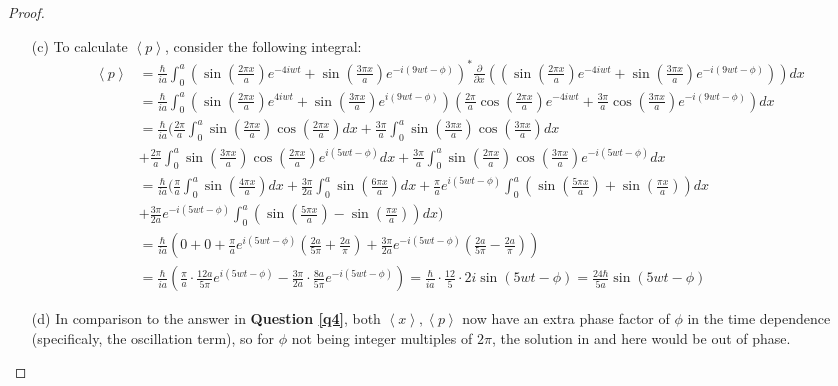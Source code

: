 \documentclass{article}
\begin{document}
\begin{proof}
\begin{itemize}
        
        \item[(c)] To calculate $\left<p\right>$, consider the following integral:
        \begin{align}
            \left<p\right>&=\frac{\hbar}{ia}\int_{0}^{a}\left(\sin\left(\frac{2\pi x}{a}\right)e^{-4iwt}+\sin\left(\frac{3\pi x}{a}\right)e^{-i(9wt-\phi)}\right)^*\frac{\partial}{\partial x}\left(\left(\sin\left(\frac{2\pi x}{a}\right)e^{-4iwt}+\sin\left(\frac{3\pi x}{a}\right)e^{-i(9wt-\phi)}\right) \right) dx\\ %
            &= \frac{\hbar}{ia}\int_{0}^{a}\left(\sin\left(\frac{2\pi x}{a}\right)e^{4iwt}+\sin\left(\frac{3\pi x}{a}\right)e^{i(9wt-\phi)}\right)\left(\frac{2\pi}{a}\cos\left(\frac{2\pi x}{a}\right)e^{-4iwt}+\frac{3\pi}{a}\cos\left(\frac{3\pi x}{a}\right)e^{-i(9wt-\phi)}\right)dx\\ %
            &=\frac{\hbar}{ia}(\frac{2\pi}{a}\int_{0}^{a}\sin\left(\frac{2\pi x}{a}\right)\cos\left(\frac{2\pi x}{a}\right)dx + \frac{3\pi}{a}\int_{0}^{a}\sin\left(\frac{3\pi x}{a}\right)\cos\left(\frac{3\pi x}{a}\right)dx\\ %
            &+\frac{2\pi}{a}\int_{0}^{a}\sin\left(\frac{3\pi x}{a}\right)\cos\left(\frac{2\pi x}{a}\right)e^{i(5wt-\phi)}dx+\frac{3\pi}{a}\int_{0}^{a}\sin\left(\frac{2\pi x}{a}\right)\cos\left(\frac{3\pi x}{a}\right)e^{-i(5wt-\phi)}dx\\ %
            &= \frac{\hbar}{ia}(\frac{\pi}{a}\int_{0}^{a}\sin\left(\frac{4\pi x}{a}\right)dx + \frac{3\pi}{2a}\int_{0}^{a}\sin\left(\frac{6\pi x}{a}\right)dx +\frac{\pi}{a}e^{i(5wt-\phi)}\int_{0}^{a}\left(\sin\left(\frac{5\pi x}{a}\right)+\sin\left(\frac{\pi x}{a}\right)\right)dx\\ %
            & + \frac{3\pi}{2a}e^{-i(5wt-\phi)}\int_{0}^{a}\left(\sin\left(\frac{5\pi x}{a}\right)-\sin\left(\frac{\pi x}{a}\right)\right)dx)\\ %
            &= \frac{\hbar}{ia}\left(0+0+\frac{\pi}{a}e^{i(5wt-\phi)}\left(\frac{2a}{5\pi}+\frac{2a}{\pi}\right) + \frac{3\pi}{2a}e^{-i(5wt-\phi)}\left(\frac{2a}{5\pi}-\frac{2a}{\pi}\right)\right)\\%
            &= \frac{\hbar}{ia}\left(\frac{\pi}{a}\cdot\frac{12a}{5\pi}e^{i(5wt-\phi)}-\frac{3\pi}{2a}\cdot\frac{8a}{5\pi}e^{-i(5wt-\phi)}\right) = \frac{\hbar}{ia}\cdot \frac{12}{5}\cdot 2i \sin(5wt-\phi) = \frac{24\hbar}{5a}\sin(5wt-\phi)
        \end{align}

        \hfil

        \item[(d)] In comparison to the answer in \textbf{Question \ref{q4}}, both $\left<x\right>,\left<p\right>$ now have an extra phase factor of $\phi$ in the time dependence (specificaly, the oscillation term), so for $\phi$ not being integer multiples of $2\pi$, the solution in  and here would be out of phase. 
        

\end{itemize}
\end{proof}
\end{document}
